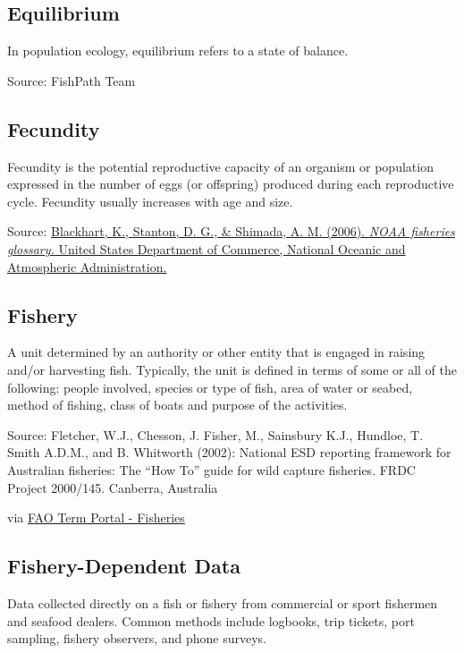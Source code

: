 \documentclass[
  11pt,
]{book}
\begin{document}
\hypertarget{equilibrium}{%
\subsection{Equilibrium}\label{equilibrium}}

In population ecology, equilibrium refers to a state of balance.

Source: FishPath Team

\hypertarget{fecundity}{%
\subsection{Fecundity}\label{fecundity}}

Fecundity is the potential reproductive capacity of an organism or population expressed in the number of eggs (or offspring) produced during each reproductive cycle. Fecundity usually increases with age and size.

Source: \href{https://repository.library.noaa.gov/view/noaa/12856}{Blackhart, K., Stanton, D. G., \& Shimada, A. M. (2006). \emph{NOAA fisheries glossary.} United States Department of Commerce, National Oceanic and Atmospheric Administration.}

\hypertarget{fishery}{%
\subsection{Fishery}\label{fishery}}

A unit determined by an authority or other entity that is engaged in raising and/or harvesting fish. Typically, the unit is defined in terms of some or all of the following: people involved, species or type of fish, area of water or seabed, method of fishing, class of boats and purpose of the activities.

Source: Fletcher, W.J., Chesson, J. Fisher, M., Sainsbury K.J., Hundloe, T. Smith A.D.M., and B. Whitworth (2002): National ESD reporting framework for Australian fisheries: The ``How To'' guide for wild capture fisheries. FRDC Project 2000/145. Canberra, Australia

via \href{http://www.fao.org/fishery/glossary/en}{FAO Term Portal - Fisheries}

\hypertarget{fishery-dependent-data}{%
\subsection{Fishery-Dependent Data}\label{fishery-dependent-data}}

Data collected directly on a fish or fishery from commercial or sport fishermen and seafood dealers. Common methods include logbooks, trip tickets, port sampling, fishery observers, and phone surveys.
\end{document}
